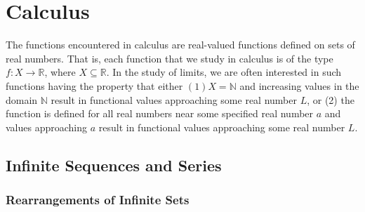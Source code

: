 \documentclass[10pt]{report}
\begin{document}
\part{Calculus}
The functions encountered in calculus are real-valued functions defined on sets of real numbers. That is, each function that we study in calculus is of the type $f: X\to \mathbb{R}$, where $X\subseteq\mathbb{R}$. In the study of limits, we are often interested in such functions having the property that either $(1)X= \mathbb{N}$ and increasing values in the domain $\mathbb{N}$ result in functional values approaching some real number $L$, or (2) the function is defined for all real numbers near some specified real number $a$ and values approaching $a$ result in functional values approaching some real number $L$.

\chapter{Infinite Sequences and Series}
\section{Rearrangements of Infinite Sets}
\end{document}
